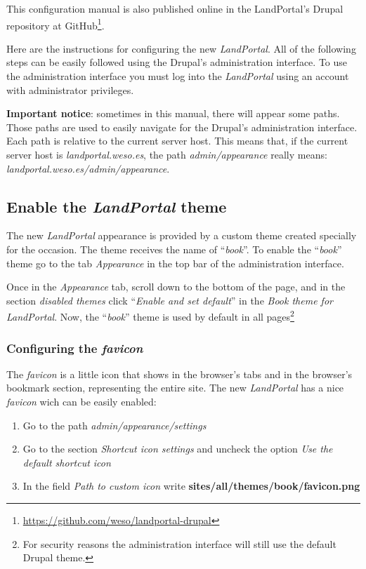This configuration manual is also published online in the LandPortal's Drupal repository at GitHub\footnote{\url{https://github.com/weso/landportal-drupal}}.

Here are the instructions for configuring the new \textit{LandPortal}.  All of the following steps can be easily followed using the Drupal's administration interface.  To use the administration interface you must log into the \textit{LandPortal} using an account with administrator privileges.

\textbf{Important notice}:  sometimes in this manual, there will appear some paths.  Those paths are used to easily navigate for the Drupal's administration interface.  Each path is relative to the current server host.  This means that, if the current server host is \textit{landportal.weso.es}, the path \textit{admin/appearance} really means: \textit{landportal.weso.es/admin/appearance}.


\subsection{Enable the \textit{LandPortal} theme}
The new \textit{LandPortal} appearance is provided by a custom theme created specially for the occasion.  The theme receives the name of ``\textit{book}''.  To enable the ``\textit{book}'' theme go to the tab \textit{Appearance} in the top bar of the administration interface.

Once in the \textit{Appearance} tab, scroll down to the bottom of the page, and in the section \textit{disabled themes} click ``\textit{Enable and set default}'' in the \textit{Book theme for LandPortal}.  Now, the ``\textit{book}'' theme is used by default in all pages\footnote{For security reasons the administration interface will still use the default Drupal theme.}


\subsubsection{Configuring the \textit{favicon}}
The \textit{favicon} is a little icon that shows in the browser's tabs and in the browser's bookmark section, representing the entire site.  The new \textit{LandPortal} has a nice \textit{favicon} wich can be easily enabled:
\begin{enumerate}
	\item Go to the path \textit{admin/appearance/settings}
	\item Go to the section \textit{Shortcut icon settings} and uncheck the option \textit{Use the default shortcut icon}
	\item In the field \textit{Path to custom icon} write \textbf{sites/all/themes/book/favicon.png}
\end{enumerate}

